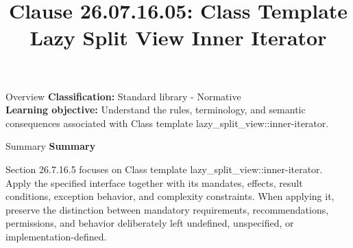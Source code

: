 \documentclass[10pt,letterpaper]{article}
\title{Clause 26.07.16.05: Class Template Lazy Split View Inner Iterator}
\author{}
\date{}
\begin{document}
\maketitle
\begin{CornellOverviewBox}{Overview}
\textbf{Classification:} Standard library - Normative\\[2pt]
\textbf{Learning objective:} Understand the rules, terminology, and semantic consequences associated with Class template lazy\_split\_view::inner-iterator.
\end{CornellOverviewBox}\begin{CornellSummaryBox}{Summary}
{\sffamily\bfseries\color{Accent} Summary}\par\vspace{3pt}Section 26.7.16.5 focuses on Class template lazy\_split\_view::inner-iterator. Apply the specified interface together with its mandates, effects, result conditions, exception behavior, and complexity constraints. When applying it, preserve the distinction between mandatory requirements, recommendations, permissions, and behavior deliberately left undefined, unspecified, or implementation-defined.
\end{CornellSummaryBox}
\end{document}
